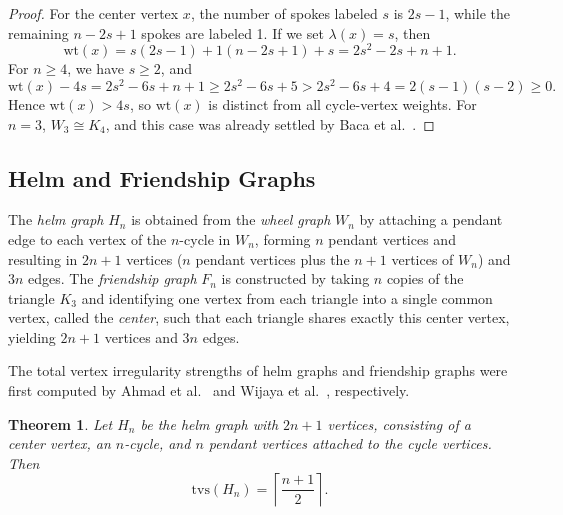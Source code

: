 \documentclass[11pt]{article}
\newtheorem{thm}{Theorem}[section]
\numberwithin{equation}{section}
\newcommand{\wt}{\mathrm{wt}}
\begin{document}
\begin{proof}
For the center vertex \(x\), the number of spokes labeled \(s\) is \(2s-1\), while the remaining \(n-2s+1\) spokes are labeled 1. If we set \(\lambda(x)=s\), then
\[
\wt(x)=s(2s-1)+1(n-2s+1)+s=2s^2-2s+n+1.
\]
For \(n\ge 4\), we have \(s\ge 2\), and
\[
\wt(x)-4s=2s^2-6s+n+1 \ge 2s^2-6s+5 > 2s^2-6s+4 = 2(s-1)(s-2)\ge 0.
\]
Hence \(\wt(x)>4s\), so \(\wt(x)\) is distinct from all cycle-vertex weights. For \(n=3\), \(W_3\cong K_4\), and this case was already settled by Baca et al.~\cite{bacaIrregularTotalLabellings2007}.

\end{proof}
\subsection{Helm and Friendship Graphs}

 The \emph{helm graph} \(H_n\) is obtained from the \emph{wheel graph} \(W_n\) by attaching a pendant edge to each vertex of the \(n\)-cycle in \(W_n\), forming \(n\) pendant vertices and resulting in \(2n + 1\) vertices (\(n\) pendant vertices plus the \(n + 1\) vertices of \(W_n\)) and \(3n\) edges. The \emph{friendship graph} \(F_n\) is constructed by taking \(n\) copies of the triangle \(K_3\) and identifying one vertex from each triangle into a single common vertex, called the \emph{center}, such that each triangle shares exactly this center vertex, yielding \(2n + 1\) vertices and \(3n\) edges.

The total vertex irregularity strengths of helm graphs and friendship graphs were first computed by Ahmad et al.~\cite{ahmadTotalVertexIrregularity} and Wijaya et al.~\cite{wijaya2008total}, respectively.

\begin{thm}\label{helm}
Let \(H_n\) be the helm graph with \(2n + 1\) vertices, consisting of a center vertex, an \(n\)-cycle, and \(n\) pendant vertices attached to the cycle vertices. Then
\[
\mathrm{tvs}(H_n) = \left\lceil \frac{n+1}{2} \right\rceil.
\]
\end{thm}
\end{document}
